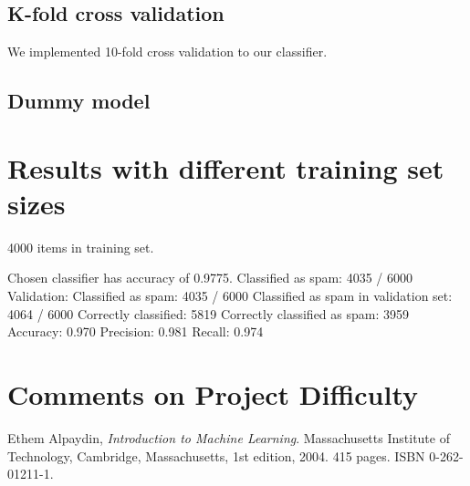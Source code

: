 \documentclass[a4paper,10pt]{article}
\begin{document}
\subsection*{K-fold cross validation}

We implemented 10-fold cross validation to our classifier.

\subsection*{Dummy model}


\section{Results with different training set sizes}

4000 items in training set.

Chosen classifier has accuracy of 0.9775.
Classified as spam: 4035 / 6000
Validation:
 Classified as spam: 4035 / 6000
 Classified as spam in validation set: 4064 / 6000
 Correctly classified: 5819
 Correctly classified as spam: 3959
 Accuracy: 0.970
 Precision: 0.981
 Recall: 0.974

\newpage
\section*{Comments on Project Difficulty}



\begin{thebibliography}{9}
  Ethem Alpaydin,
  \emph{Introduction to Machine Learning}.
  Massachusetts Institute of Technology, Cambridge, Massachusetts,
  1st edition,
  2004. 415 pages. ISBN 0-262-01211-1.
\end{thebibliography}
\end{document}
